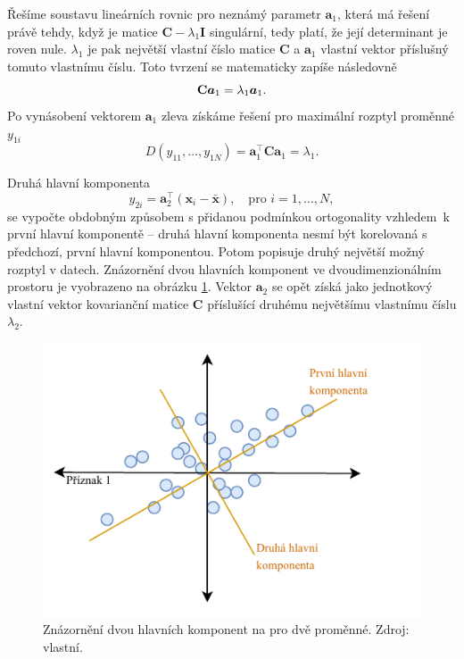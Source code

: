 Řešíme soustavu lineárních rovnic pro neznámý parametr $\bm{a}_1$, která má řešení právě tehdy, když je matice $\mathbf{C} - \lambda_1 \mathbf{I} $ singulární, tedy platí, že její determinant  je roven nule. $\lambda_1$ je pak největší vlastní číslo matice $\mathbf{C}$ a $\bm{a}_1$ vlastní vektor příslušný tomuto vlastnímu číslu. Toto tvrzení se matematicky zapíše následovně
\begin{equation}
    \mathbf{C} \bm{a}_1 = \lambda_1 \bm{a}_1. \\
\end{equation}
Po vynásobení vektorem $\bm{a}_1$ zleva získáme řešení pro maximální rozptyl proměnné $y_{1i}$
\begin{equation}
    D(y_{11}, \ldots, y_{1N}) = \bm{a}_1^\top \mathbf{C} \bm{a}_1 = \lambda_1.
\end{equation}


Druhá hlavní komponenta
\begin{equation}
    y_{2i} = \bm{a}_2^\top (\bm{x}_i - \bar{\bm{x}}), \quad \mbox{pro } i=1,\ldots,N,
\end{equation}
se vypočte obdobným způsobem s přidanou podmínkou ortogonality vzhledem~k první hlavní komponentě -- druhá hlavní komponenta nesmí být korelovaná s předchozí, první hlavní komponentou. Potom popisuje druhý největší možný rozptyl v datech. Znázornění dvou hlavních komponent ve dvoudimenzionálním prostoru je vyobrazeno na obrázku \ref*{obr:met:PCA1}.
Vektor  $\bm{a}_2$ se opět získá jako jednotkový vlastní vektor kovarianční matice $\mathbf{C}$ příslušící druhému největšímu vlastnímu číslu $\lambda_2$.\cite{bib:PCA1, bib:PCA3} %

\begin{figure}[hbtp!]
    \centering
    \includegraphics[width=\textwidth]{obrazky/PCA.pdf}
    \caption{Znázornění dvou hlavních komponent na pro dvě proměnné. Zdroj: vlastní.}
    \label{obr:met:PCA1}
\end{figure}


